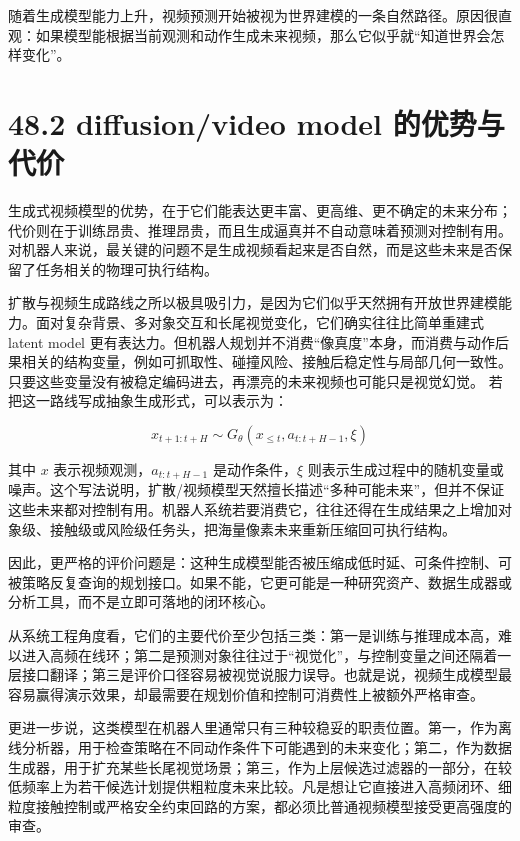 随着生成模型能力上升，视频预测开始被视为世界建模的一条自然路径。原因很直观：如果模型能根据当前观测和动作生成未来视频，那么它似乎就“知道世界会怎样变化”。

\section*{48.2 diffusion/video model 的优势与代价}


生成式视频模型的优势，在于它们能表达更丰富、更高维、更不确定的未来分布；代价则在于训练昂贵、推理昂贵，而且生成逼真并不自动意味着预测对控制有用。对机器人来说，最关键的问题不是生成视频看起来是否自然，而是这些未来是否保留了任务相关的物理可执行结构。

扩散与视频生成路线之所以极具吸引力，是因为它们似乎天然拥有开放世界建模能力。面对复杂背景、多对象交互和长尾视觉变化，它们确实往往比简单重建式 latent model 更有表达力。但机器人规划并不消费“像真度”本身，而消费与动作后果相关的结构变量，例如可抓取性、碰撞风险、接触后稳定性与局部几何一致性。只要这些变量没有被稳定编码进去，再漂亮的未来视频也可能只是视觉幻觉。 若把这一路线写成抽象生成形式，可以表示为：

\begin{equation*}
x_{t+1:t+H} \sim G_\theta(x_{\le t}, a_{t:t+H-1}, \xi)
\end{equation*}

其中 \(x\) 表示视频观测，\(a_{t:t+H-1}\) 是动作条件，\(\xi\) 则表示生成过程中的随机变量或噪声。这个写法说明，扩散/视频模型天然擅长描述“多种可能未来”，但并不保证这些未来都对控制有用。机器人系统若要消费它，往往还得在生成结果之上增加对象级、接触级或风险级任务头，把海量像素未来重新压缩回可执行结构。

因此，更严格的评价问题是：这种生成模型能否被压缩成低时延、可条件控制、可被策略反复查询的规划接口。如果不能，它更可能是一种研究资产、数据生成器或分析工具，而不是立即可落地的闭环核心。

从系统工程角度看，它们的主要代价至少包括三类：第一是训练与推理成本高，难以进入高频在线环；第二是预测对象往往过于“视觉化”，与控制变量之间还隔着一层接口翻译；第三是评价口径容易被视觉说服力误导。也就是说，视频生成模型最容易赢得演示效果，却最需要在规划价值和控制可消费性上被额外严格审查。

更进一步说，这类模型在机器人里通常只有三种较稳妥的职责位置。第一，作为离线分析器，用于检查策略在不同动作条件下可能遇到的未来变化；第二，作为数据生成器，用于扩充某些长尾视觉场景；第三，作为上层候选过滤器的一部分，在较低频率上为若干候选计划提供粗粒度未来比较。凡是想让它直接进入高频闭环、细粒度接触控制或严格安全约束回路的方案，都必须比普通视频模型接受更高强度的审查。

